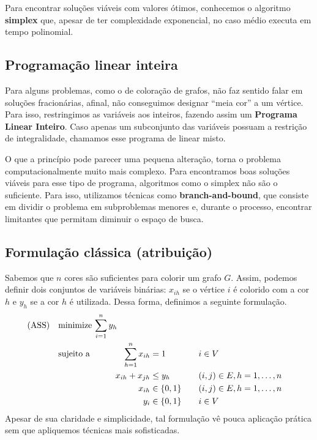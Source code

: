 \documentclass[11pt]{article}
\begin{document}
Para encontrar soluções viáveis com valores ótimos, conhecemos o algoritmo \textbf{simplex} que, apesar de ter complexidade exponencial, no caso médio executa em tempo polinomial.

\subsection{Programação linear inteira}
\label{sec:orgebd1c5e}
Para alguns problemas, como o de coloração de grafos, não faz sentido falar em soluções fracionárias, afinal, não conseguimos designar ``meia cor'' a um vértice.
Para isso, restringimos as variáveis aos inteiros, fazendo assim um \textbf{Programa Linear Inteiro}. Caso apenas um subconjunto das variáveis possuam a restrição de integralidade, chamamos esse programa de linear misto.

O que a princípio pode parecer uma pequena alteração, torna o problema computacionalmente muito mais complexo.
Para encontramos boas soluções viáveis para esse tipo de programa, algoritmos como o simplex não são o suficiente.
Para isso, utilizamos técnicas como \textbf{branch-and-bound}, que consiste em dividir o problema em subproblemas menores e, durante o processo, encontrar limitantes que permitam diminuir o espaço de busca.

\subsection{Formulação clássica (atribuição)}
\label{sec:orgf2877b3}
Sabemos que \(n\) cores são suficientes para colorir um grafo \(G\). Assim, podemos definir dois conjuntos de variáveis binárias: \(x_{ih}\) se o vértice \(i\) é colorido com a cor \(h\) e \(y_h\) se a cor \(h\) é utilizada. Dessa forma, definimos a seguinte formulação.
\begin{alignat*}{4}
\mathrm{(ASS)} \quad & \omit\rlap{minimize  $\displaystyle \sum_{i=1}^n y_h$} \\
& \mbox{sujeito a}&& \quad & \sum_{h=1}^n x_{ih}&= 1        & \quad & i \in V \\
&                 &&   & x_{ih} + x_{jh}    & \leq y_h &   & (i,j) \in E, h=1,\dots,n \\
&                 &&   & x_{ih}    & \in \{0,1\} &   & (i,j) \in E, h=1,\dots,n\\
&                 &&   & y_i       & \in \{0,1\} &   & i \in V
\end{alignat*}
Apesar de sua claridade e simplicidade, tal formulação vê pouca aplicação prática sem que apliquemos técnicas mais sofisticadas.
\end{document}
